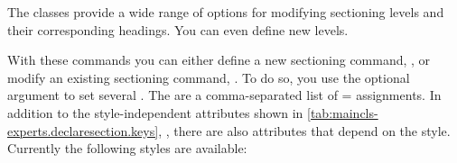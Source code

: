 The \KOMAScript{} classes provide a wide range of options for modifying
sectioning levels and their corresponding headings. You can even define new
levels.

\begin{Declaration}
\end{Declaration}
With these commands you can either define a new sectioning
command, , or modify an existing sectioning command,
. To do so, you use the optional argument to set several
. The  are a comma-separated list of
= assignments. In addition to the style-independent
attributes shown in \autoref{tab:maincls-experts.declaresection.keys},
, there are also
attributes that depend on the style. Currently the following styles are
available:

